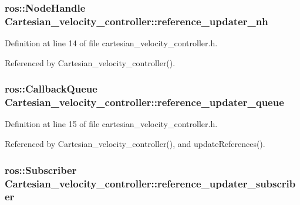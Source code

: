 \hypertarget{classCartesian__velocity__controller_a7d04d378a2a6d19870a620883dcd3e09}{
\subsubsection[{reference\-\_\-updater\-\_\-nh}]{\setlength{\rightskip}{0pt plus 5cm}ros\-::\-Node\-Handle Cartesian\-\_\-velocity\-\_\-controller\-::reference\-\_\-updater\-\_\-nh\hspace{0.3cm}{\ttfamily [protected]}}}\label{classCartesian__velocity__controller_a7d04d378a2a6d19870a620883dcd3e09}


Definition at line 14 of file cartesian\-\_\-velocity\-\_\-controller.\-h.



Referenced by Cartesian\-\_\-velocity\-\_\-controller().

\hypertarget{classCartesian__velocity__controller_ad2804cf83a42305d18572abdbbfd1c3f}{
\subsubsection[{reference\-\_\-updater\-\_\-queue}]{\setlength{\rightskip}{0pt plus 5cm}ros\-::\-Callback\-Queue Cartesian\-\_\-velocity\-\_\-controller\-::reference\-\_\-updater\-\_\-queue\hspace{0.3cm}{\ttfamily [protected]}}}\label{classCartesian__velocity__controller_ad2804cf83a42305d18572abdbbfd1c3f}


Definition at line 15 of file cartesian\-\_\-velocity\-\_\-controller.\-h.



Referenced by Cartesian\-\_\-velocity\-\_\-controller(), and update\-References().

\hypertarget{classCartesian__velocity__controller_a75412b9859afe4b800f9613c9cb8d17f}{
\subsubsection[{reference\-\_\-updater\-\_\-subscriber}]{\setlength{\rightskip}{0pt plus 5cm}ros\-::\-Subscriber Cartesian\-\_\-velocity\-\_\-controller\-::reference\-\_\-updater\-\_\-subscriber\hspace{0.3cm}{\ttfamily [protected]}}}\label{classCartesian__velocity__controller_a75412b9859afe4b800f9613c9cb8d17f}


